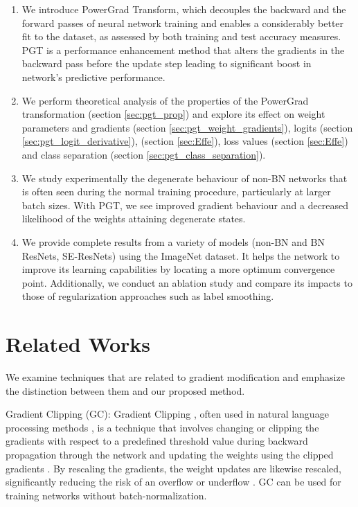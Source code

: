 \documentclass[times,sort&compress]{elsarticle}
\begin{document}
\begin{enumerate}

\item We introduce PowerGrad Transform, which decouples the backward and the forward
passes of neural network training and enables a considerably better fit to the dataset,
as assessed by both training and test accuracy measures. PGT is a performance
enhancement method that alters the gradients in the backward pass before the update step
leading to significant boost in network's predictive performance.

\item We perform theoretical analysis of the properties of the PowerGrad transformation
(section \ref{sec:pgt_prop}) and explore its effect on weight parameters and gradients
(section \ref{sec:pgt_weight_gradients}), logits (section
\ref{sec:pgt_logit_derivative}), (section \ref{sec:Effe}), loss values (section
\ref{sec:Effe}) and class separation (section \ref{sec:pgt_class_separation}).

\item We study experimentally the degenerate behaviour of non-BN networks that is often
seen during the normal training procedure, particularly at larger batch sizes. With PGT,
we see improved gradient behaviour and a decreased likelihood of the weights attaining
degenerate states.

\item We provide complete results from a variety of models (non-BN and BN ResNets,
SE-ResNets) using the ImageNet dataset. It helps the network to improve its learning
capabilities by locating a more optimum convergence point. Additionally, we conduct an
ablation study and compare its impacts to those of regularization approaches such as
label smoothing.

\end{enumerate}






\section{Related Works}
\label{sec:Rela}




We examine techniques that are related to gradient modification and emphasize the
distinction between them and our proposed method.




Gradient Clipping (GC): Gradient Clipping \cite{pascanu2013difficulty}, often used in
natural language processing methods \cite{merity2017regularizing}, is a technique that
involves changing or clipping the gradients with respect to a predefined threshold value
during backward propagation through the network and updating the weights using the
clipped gradients \cite{zhang2019gradient, smith2020generalization}. By rescaling the
gradients, the weight updates are likewise rescaled, significantly reducing the risk of
an overflow or underflow \cite{pascanu2012understanding}. GC can be used for training
networks without batch-normalization.
\end{document}
